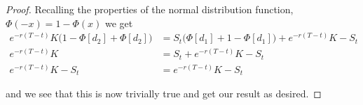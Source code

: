 \documentclass[12pt]{article}
\begin{document}
\begin{proof}
Recalling the properties of the normal distribution function, $\Phi(-x) = 1 - \Phi(x)$ we get
\begin{align*}
	e^{-r(T - t)}K\big(1 - \Phi[d_2] + \Phi[d_2]\big) &= S_t\big(\Phi[d_1] + 1 - \Phi[d_1]\big) + e^{-r(T - t)}K - S_t \\
	e^{-r(T - t)}K &= S_t + e^{-r(T - t)}K - S_t \\
	e^{-r(T - t)}K - S_t &= e^{-r(T - t)}K - S_t
\end{align*}

and we see that this is now trivially true and get our result as desired.
\end{proof}
\end{document}
